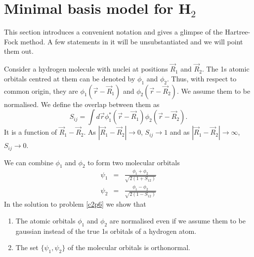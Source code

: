 \section{Minimal basis model for H$_2$}
This section introduces a convenient notation and gives a glimpse of the Hartree-
Fock method. A few statements in it will be unsubstantiated and we will point
them out.

Consider a hydrogen molecule with nuclei at positions $\vec{R}_1$ and 
$\vec{R}_2$. The 1s atomic orbitals centred at them can be denoted by $\phi_1$
and $\phi_2$. Thus, with respect to common origin, they are $\phi_1(\vec{r} - 
\vec{R}_1)$ and $\phi_2(\vec{r} - \vec{R}_2)$. We assume them to be normalised.
We define the overlap between them as
\begin{equation}\label{c2e51}
S_{ij} = \int d\vec{r}\phi_1^\ast(\vec{r}-\vec{R}_1)\phi_2(\vec{r} - \vec{R}_2).
\end{equation}
It is a function of $\vec{R}_1 - \vec{R}_2$. As $|\vec{R}_1 - \vec{R}_2| 
\rightarrow 0$, $S_{ij} \rightarrow 1$ and as $|\vec{R}_1 - \vec{R}_2|
\rightarrow \infty$, $S_{ij} \rightarrow 0$.

We can combine $\phi_1$ and $\phi_2$ to form two molecular orbitals
\begin{eqnarray}
\psi_1 &=& \frac{\phi_1 + \phi_2}{\sqrt{2(1 + S_{12})}} \label{c2e52} \\
\psi_2 &=& \frac{\phi_1 - \phi_2}{\sqrt{2(1 - S_{12})}} \label{c2e53}
\end{eqnarray}
In the solution to problem \ref{c2p6} we show that
\begin{enumerate}
\item The atomic orbitals $\phi_1$ and $\phi_2$ are normalised even if we assume
them to be gaussian instead of the true 1s orbitals of a hydrogen atom.
\item The set $\{\psi_1, \psi_2\}$ of the molecular orbitals is orthonormal.
\end{enumerate}


